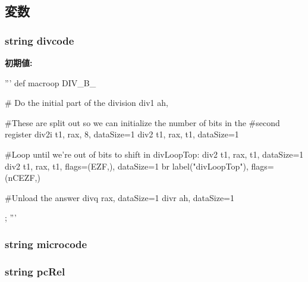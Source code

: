 \subsection{変数}
\hypertarget{namespaceinsts_1_1general__purpose_1_1arithmetic_1_1multiply__and__divide_ae7e0abb7d464af1d5f77999ed3ea7846}{
\subsubsection[{divcode}]{\setlength{\rightskip}{0pt plus 5cm}string {\bf divcode}}}
\label{namespaceinsts_1_1general__purpose_1_1arithmetic_1_1multiply__and__divide_ae7e0abb7d464af1d5f77999ed3ea7846}
{\bfseries 初期値:}
\begin{DoxyCode}
'''
def macroop DIV_B_%
{
    # Do the initial part of the division
    div1 ah, %

    #These are split out so we can initialize the number of bits in the
    #second register
    div2i t1, rax, 8, dataSize=1
    div2 t1, rax, t1, dataSize=1

    #Loop until we're out of bits to shift in
divLoopTop:
    div2 t1, rax, t1, dataSize=1
    div2 t1, rax, t1, flags=(EZF,), dataSize=1
    br label("divLoopTop"), flags=(nCEZF,)

    #Unload the answer
    divq rax, dataSize=1
    divr ah, dataSize=1
};
'''
\end{DoxyCode}
\hypertarget{namespaceinsts_1_1general__purpose_1_1arithmetic_1_1multiply__and__divide_a770f11a173e99389a8802f0107ed8f52}{
\subsubsection[{microcode}]{\setlength{\rightskip}{0pt plus 5cm}string {\bf microcode}}}
\label{namespaceinsts_1_1general__purpose_1_1arithmetic_1_1multiply__and__divide_a770f11a173e99389a8802f0107ed8f52}
\hypertarget{namespaceinsts_1_1general__purpose_1_1arithmetic_1_1multiply__and__divide_a53602c75f8ee246158cefec1f1817374}{
\subsubsection[{pcRel}]{\setlength{\rightskip}{0pt plus 5cm}string {\bf pcRel}}}

